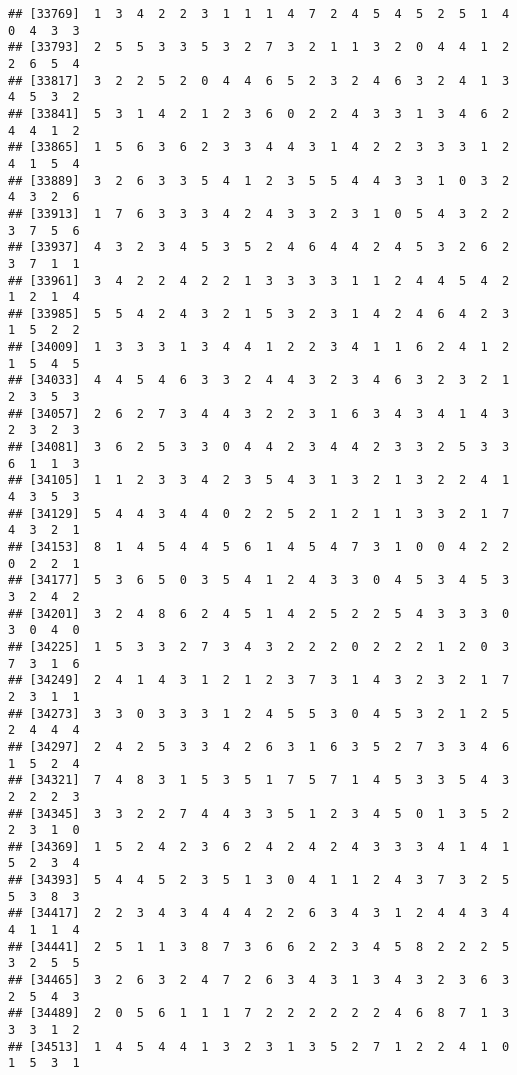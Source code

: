 \documentclass[
]{article}
\begin{document}
\begin{verbatim}
## [33769]  1  3  4  2  2  3  1  1  1  4  7  2  4  5  4  5  2  5  1  4  0  4  3  3
## [33793]  2  5  5  3  3  5  3  2  7  3  2  1  1  3  2  0  4  4  1  2  2  6  5  4
## [33817]  3  2  2  5  2  0  4  4  6  5  2  3  2  4  6  3  2  4  1  3  4  5  3  2
## [33841]  5  3  1  4  2  1  2  3  6  0  2  2  4  3  3  1  3  4  6  2  4  4  1  2
## [33865]  1  5  6  3  6  2  3  3  4  4  3  1  4  2  2  3  3  3  1  2  4  1  5  4
## [33889]  3  2  6  3  3  5  4  1  2  3  5  5  4  4  3  3  1  0  3  2  4  3  2  6
## [33913]  1  7  6  3  3  3  4  2  4  3  3  2  3  1  0  5  4  3  2  2  3  7  5  6
## [33937]  4  3  2  3  4  5  3  5  2  4  6  4  4  2  4  5  3  2  6  2  3  7  1  1
## [33961]  3  4  2  2  4  2  2  1  3  3  3  3  1  1  2  4  4  5  4  2  1  2  1  4
## [33985]  5  5  4  2  4  3  2  1  5  3  2  3  1  4  2  4  6  4  2  3  1  5  2  2
## [34009]  1  3  3  3  1  3  4  4  1  2  2  3  4  1  1  6  2  4  1  2  1  5  4  5
## [34033]  4  4  5  4  6  3  3  2  4  4  3  2  3  4  6  3  2  3  2  1  2  3  5  3
## [34057]  2  6  2  7  3  4  4  3  2  2  3  1  6  3  4  3  4  1  4  3  2  3  2  3
## [34081]  3  6  2  5  3  3  0  4  4  2  3  4  4  2  3  3  2  5  3  3  6  1  1  3
## [34105]  1  1  2  3  3  4  2  3  5  4  3  1  3  2  1  3  2  2  4  1  4  3  5  3
## [34129]  5  4  4  3  4  4  0  2  2  5  2  1  2  1  1  3  3  2  1  7  4  3  2  1
## [34153]  8  1  4  5  4  4  5  6  1  4  5  4  7  3  1  0  0  4  2  2  0  2  2  1
## [34177]  5  3  6  5  0  3  5  4  1  2  4  3  3  0  4  5  3  4  5  3  3  2  4  2
## [34201]  3  2  4  8  6  2  4  5  1  4  2  5  2  2  5  4  3  3  3  0  3  0  4  0
## [34225]  1  5  3  3  2  7  3  4  3  2  2  2  0  2  2  2  1  2  0  3  7  3  1  6
## [34249]  2  4  1  4  3  1  2  1  2  3  7  3  1  4  3  2  3  2  1  7  2  3  1  1
## [34273]  3  3  0  3  3  3  1  2  4  5  5  3  0  4  5  3  2  1  2  5  2  4  4  4
## [34297]  2  4  2  5  3  3  4  2  6  3  1  6  3  5  2  7  3  3  4  6  1  5  2  4
## [34321]  7  4  8  3  1  5  3  5  1  7  5  7  1  4  5  3  3  5  4  3  2  2  2  3
## [34345]  3  3  2  2  7  4  4  3  3  5  1  2  3  4  5  0  1  3  5  2  2  3  1  0
## [34369]  1  5  2  4  2  3  6  2  4  2  4  2  4  3  3  3  4  1  4  1  5  2  3  4
## [34393]  5  4  4  5  2  3  5  1  3  0  4  1  1  2  4  3  7  3  2  5  5  3  8  3
## [34417]  2  2  3  4  3  4  4  4  2  2  6  3  4  3  1  2  4  4  3  4  4  1  1  4
## [34441]  2  5  1  1  3  8  7  3  6  6  2  2  3  4  5  8  2  2  2  5  3  2  5  5
## [34465]  3  2  6  3  2  4  7  2  6  3  4  3  1  3  4  3  2  3  6  3  2  5  4  3
## [34489]  2  0  5  6  1  1  1  7  2  2  2  2  2  2  4  6  8  7  1  3  3  3  1  2
## [34513]  1  4  5  4  4  1  3  2  3  1  3  5  2  7  1  2  2  4  1  0  1  5  3  1

\end{verbatim}
\end{document}
